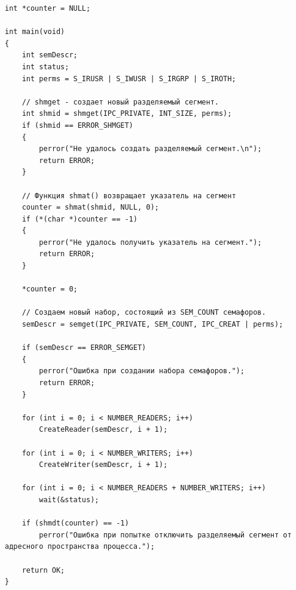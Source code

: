 \begin{lstlisting}[label=some-code,caption=Главный файл main]
int *counter = NULL;

int main(void)
{
	int semDescr;
	int status;
	int perms = S_IRUSR | S_IWUSR | S_IRGRP | S_IROTH;

	// shmget - создает новый разделяемый сегмент.
	int shmid = shmget(IPC_PRIVATE, INT_SIZE, perms);
	if (shmid == ERROR_SHMGET)
	{
		perror("Не удалось создать разделяемый сегмент.\n");
		return ERROR;
	}

	// Функция shmat() возвращает указатель на сегмент
	counter = shmat(shmid, NULL, 0);
	if (*(char *)counter == -1)
	{
		perror("Не удалось получить указатель на сегмент.");
		return ERROR;
	}

	*counter = 0;

	// Создаем новый набор, состоящий из SEM_COUNT семафоров.
	semDescr = semget(IPC_PRIVATE, SEM_COUNT, IPC_CREAT | perms);

	if (semDescr == ERROR_SEMGET)
	{
		perror("Ошибка при создании набора семафоров.");
		return ERROR;
	}

	for (int i = 0; i < NUMBER_READERS; i++)
		CreateReader(semDescr, i + 1);

	for (int i = 0; i < NUMBER_WRITERS; i++)
		CreateWriter(semDescr, i + 1);

	for (int i = 0; i < NUMBER_READERS + NUMBER_WRITERS; i++)
		wait(&status);

	if (shmdt(counter) == -1)
		perror("Ошибка при попытке отключить разделяемый сегмент от адресного пространства процесса.");

	return OK;
}
\end{lstlisting}

